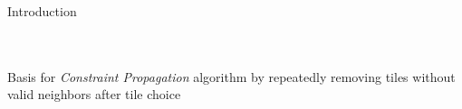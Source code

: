 \documentclass{beamer}
\begin{document}
  \begin{frame}[fragile]{Introduction}

    \hfill \\
    \hfill \\

    Basis for \textit{Constraint Propagation} algorithm by
    repeatedly removing tiles without valid neighbors
    after tile choice





\end{frame}
\end{document}
